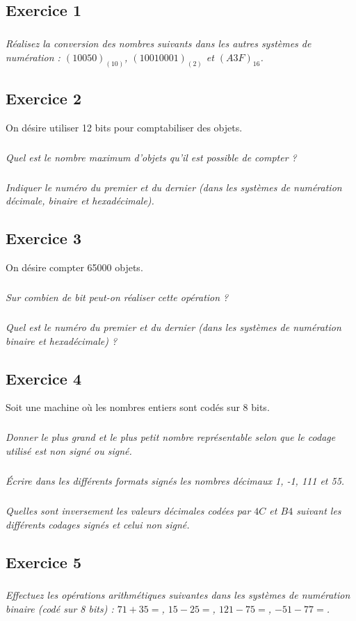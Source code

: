 \documentclass[10pt,fleqn]{article} %
\begin{document}
\begin{multicols}{2}
\footnotesize
\subsection*{Exercice 1}
\subparagraph*{}
\textit{Réalisez la conversion des nombres suivants dans les autres systèmes de numération :
$(10050)_{(10)}$,
$(1001 0001)_{(2)}$ et 
$(A3F)_{16}$.}

\subsection*{Exercice 2}
On désire utiliser 12 bits pour comptabiliser des objets.
\subparagraph{}
\textit{Quel est le nombre maximum d'objets qu'il est possible de compter ?}
\subparagraph{}
\textit{Indiquer le numéro du premier et du dernier (dans les systèmes de numération décimale, binaire et hexadécimale).}


\subsection*{Exercice 3}
\setcounter{subparagraph}{0}

On désire compter 65000 objets. 
\subparagraph{}
\textit{Sur combien de bit peut-on réaliser cette opération ?}
\subparagraph{}
\textit{Quel est le numéro du premier et du dernier (dans les systèmes de numération binaire et hexadécimale) ?}


\subsection*{Exercice 4}
Soit une machine où les nombres entiers sont codés sur 8 bits.
\setcounter{subparagraph}{0}
\subparagraph{}
\textit{Donner le plus grand et le plus petit nombre représentable selon que le codage utilisé est non signé ou signé.}

\subparagraph{}
\textit{Écrire dans les différents formats signés les nombres décimaux 1, -1, 111 et 55.}
\subparagraph{}
\textit{Quelles sont inversement les valeurs décimales codées par $4C$ et $B4$ suivant les différents codages signés et celui non signé.}




\subsection*{Exercice 5}
\setcounter{subparagraph}{0}
\subparagraph*{}
\textit{Effectuez les opérations arithmétiques suivantes dans les systèmes de numération binaire (codé sur 8 bits) : $71 + 35 =$, $15 - 25 =$, $121 - 75 =$, $-51 - 77 =$.}



\end{multicols}
\end{document}
